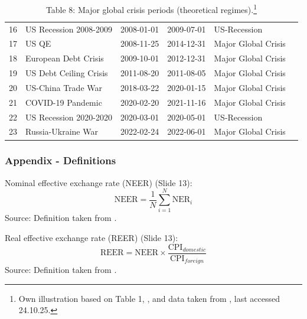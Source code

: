 \begin{frame}
\begin{table}
\begin{tabular}{l|lllll}
        16 & US Recession 2008-2009 & 2008-01-01 & 2009-07-01 & US-Recession & \cite{fred_usrec} \\
        17 & US QE & 2008-11-25 & 2014-12-31 & Major Global Crisis & \cite{martinez2025equilibrium} \\
        18 & European Debt Crisis & 2009-10-01 & 2012-12-31 & Major Global Crisis & \cite{martinez2025equilibrium} \\
        19 & US Debt Ceiling Crisis & 2011-08-20 & 2011-08-05 & Major Global Crisis & \cite{martinez2025equilibrium} \\
        20 & US-China Trade War & 2018-03-22 & 2020-01-15 & Major Global Crisis & \cite{hartley2025tariffs} \\
        21 & COVID-19 Pandemic & 2020-02-20 & 2021-11-16 & Major Global Crisis & \cite{martins2023events} \\
        22 & US Recession 2020-2020 & 2020-03-01 & 2020-05-01 & US-Recession & \cite{fred_usrec} \\
        23 & Russia-Ukraine War & 2022-02-24 & 2022-06-01 & Major Global Crisis & \cite{chandan2025currency} \\
        \bottomrule
        \end{tabular}
		\caption{\footnotesize Table 8: Major global crisis periods (theoretical regimes).\footnote{Own illustration based on Table 1, \cite{loyttyniemi2023financial}, and data taken from \cite{fred_usrec}, last accessed 24.10.25.}\label{tab:major_global_crisis_periods}}
	\end{table}
\end{frame}
\begin{frame}
    \frametitle{Appendix - Definitions}


    \begin{block}{Nominal effective exchange rate (NEER) (Slide 13):}
        \begin{equation}
            \text{NEER} = \frac{1}{N} \sum_{i=1}^{N} \text{NER}_{i}
        \end{equation}
        \footnotesize{Source: Definition taken from \cite{bis_2025_effective_exchange_rates}.}
    \end{block}

    \begin{block}{Real effective exchange rate (REER) (Slide 13):}
        \begin{equation}
            \text{REER} = \text{NEER} \times \frac{\text{CPI}_{domestic}}{\text{CPI}_{foreign}}
        \end{equation}
        \footnotesize{Source: Definition taken from \cite{bis_2025_effective_exchange_rates}.}
    \end{block}
\end{frame}
